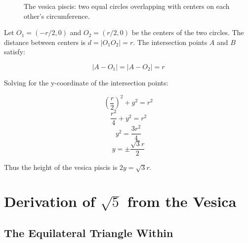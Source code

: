 \begin{figure}[H]
\centering
{}
\caption{The vesica piscis: two equal circles overlapping with centers on each other's circumference.}
\label{fig:vesica}
\end{figure}

Let $O_1 = (-r/2, 0)$ and $O_2 = (r/2, 0)$ be the centers of the two circles. The distance between centers is $d = |O_1 O_2| = r$. The intersection points $A$ and $B$ satisfy:

\[
|A - O_1| = |A - O_2| = r
\]

Solving for the y-coordinate of the intersection points:

\[
\left(\frac{r}{2}\right)^2 + y^2 = r^2
\]
\[
\frac{r^2}{4} + y^2 = r^2
\]
\[
y^2 = \frac{3r^2}{4}
\]
\[
y = \pm\frac{\sqrt{3}r}{2}
\]

Thus the height of the vesica piscis is $2y = \sqrt{3}r$.

\section{Derivation of $\sqrt{5}$ from the Vesica}

\subsection{The Equilateral Triangle Within}

